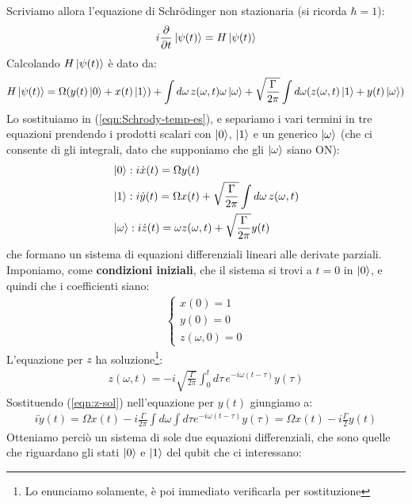 \documentclass[../../InformazioneQuantistica.tex]{subfiles}
\begin{document}
Scriviamo allora l'equazione di Schr\"odinger non stazionaria (si ricorda $\hbar=1$):
\begin{align}
i\frac{\partial}{\partial t}\Ket{\psi(t)}=H\Ket{\psi(t)}
\label{eqn:Schrody-temp-es}
\end{align}
Calcolando $H\Ket{\psi(t)}$ è dato da:
\begin{align*}
H\Ket{\psi(t)} = \Omega (y(t)\Ket{0}+x(t)\Ket{1}) + \int d\omega\, z(\omega,t)\omega\Ket{\omega} + \sqrt{\frac{\Gamma}{2\pi}}\int d\omega (z(\omega, t)\Ket{1}+y(t)\Ket{\omega})
\end{align*}
Lo sostituiamo in (\ref{eqn:Schrody-temp-es}), e separiamo i vari termini in tre equazioni prendendo i prodotti scalari con $\Ket{0}$, $\Ket{1}$ e un generico $\Ket{\omega}$ (che ci consente di  gli integrali, dato che supponiamo che gli $\Ket{\omega}$ siano ON):
\begin{align*}
&\Ket{0}: i\dot{x}(t)=\Omega y(t)\\
&\Ket{1}: i\dot{y}(t)=\Omega x(t)+\sqrt{\frac{\Gamma}{2\pi}}\int d\omega\, z(\omega,t)\\
&\Ket{\omega}: i\dot{z}(t)=\omega z(\omega, t) + \sqrt{\frac{\Gamma}{2\pi}}y(t)
\end{align*}
che formano un sistema di equazioni differenziali lineari alle derivate parziali.\\
Imponiamo, come \textbf{condizioni iniziali}, che il sistema si trovi a $t=0$ in $\Ket{0}$, e quindi che i coefficienti siano:
\begin{align*}
\begin{cases}
x(0) =1\\
y(0) = 0\\
z(\omega, 0)=0
\end{cases}
\end{align*}
L'equazione per $z$ ha soluzione\footnote{Lo enunciamo solamente, è poi immediato verificarla per sostituzione}:
\begin{align}
z(\omega, t) = -i\sqrt{\frac{\Gamma}{2\pi}}\int_0^t d\tau\, e^{-i\omega(t-\tau)}y(\tau)
\label{eqn:z-sol}
\end{align}
Sostituendo (\ref{eqn:z-sol}) nell'equazione per $y(t)$ giungiamo a:
\begin{align*}
i \dot{y}(t) = \Omega x(t) - i\frac{\Gamma}{2\pi}\int d\omega \int d\tau e^{-i\omega (t-\tau)} y(\tau)= \Omega x(t) - i\frac{\Gamma}{2} y(t)
\end{align*}
Otteniamo perciò un sistema di sole due equazioni differenziali, che sono quelle che riguardano gli stati $\Ket{0}$ e $\Ket{1}$ del qubit che ci interessano:
\end{document}
